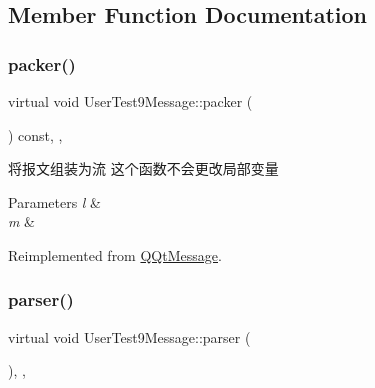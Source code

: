 \subsection{Member Function Documentation}
\mbox{\label{class_user_test9_message_a331d2fe4866837706295952962ff41c1}} 
\subsubsection{\texorpdfstring{packer()}{packer()}}
{\footnotesize\ttfamily virtual void User\+Test9\+Message\+::packer (\begin{DoxyParamCaption}\item[{Q\+Byte\+Array \&}]{ }\end{DoxyParamCaption}) const\hspace{0.3cm}{\ttfamily [inline]}, {\ttfamily [override]}, {\ttfamily [virtual]}}



将报文组装为流 这个函数不会更改局部变量 


\begin{DoxyParams}{Parameters}
{\em l} & \\
\hline
{\em m} & \\
\hline
\end{DoxyParams}


Reimplemented from \mbox{\hyperlink{class_q_qt_message_af1885c2c3628495808dca66ee8d72e14}{Q\+Qt\+Message}}.

\mbox{\label{class_user_test9_message_ae681cf1cb8b410628887aab2c80fcdf9}} 
\subsubsection{\texorpdfstring{parser()}{parser()}}
{\footnotesize\ttfamily virtual void User\+Test9\+Message\+::parser (\begin{DoxyParamCaption}\item[{const Q\+Byte\+Array \&}]{ }\end{DoxyParamCaption})\hspace{0.3cm}{\ttfamily [inline]}, {\ttfamily [override]}, {\ttfamily [virtual]}}



